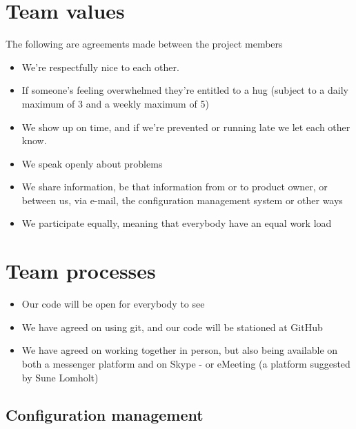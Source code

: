 \documentclass[a4paper,11pt]{article}
\begin{document}

\section{Team values} %
\label{sec:team_values}
The following are agreements made between the project members

\begin{itemize}
	\item We're respectfully nice to each other.

  	\item If someone's feeling overwhelmed they're entitled to a hug (subject to a daily maximum of 3 and a weekly maximum of 5)

  	\item We show up on time, and if we're prevented or running late we let each other know.

  	\item We speak openly about problems

  	\item We share information, be that information from or to product owner, or between us, via e-mail, the configuration management system or other ways

  	\item We participate equally, meaning that everybody have an equal work load
\end{itemize}


\section{Team processes} %
\label{sec:team_processes}

\begin{itemize}
	\item Our code will be open for everybody to see
	
	\item We have agreed on using git, and our code will be stationed at GitHub
	
	\item We have agreed on working together in person, but also being available on both a messenger platform and on Skype - or eMeeting (a platform suggested by Sune Lomholt)
\end{itemize}

\subsection{Configuration management} %
\label{subsec:configuration_management}
\end{document}
